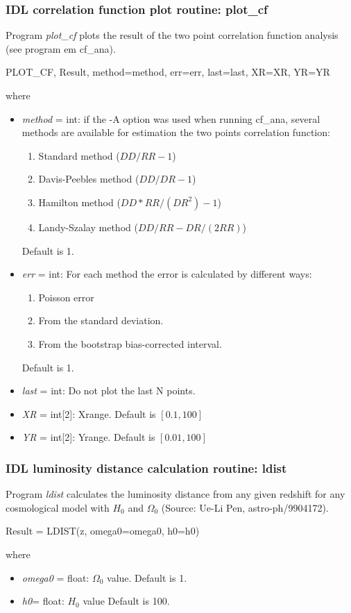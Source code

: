 \subsubsection{IDL correlation function plot routine: plot\_cf}

Program {\em plot\_cf} plots the result of the two point correlation 
function analysis (see program {em cf\_ana}).

\begin{center}
PLOT\_CF, Result, method=method, err=err, last=last, XR=XR, YR=YR
\end{center}
where
\begin{itemize}
\item {\em method }= int: if the -A option was used when running cf\_ana,
several methods are available for estimation the two points correlation function:
\begin{enumerate}
\item Standard method ($DD/RR-1$)  
\item Davis-Peebles method ($DD/DR-1$) 
\item Hamilton method ($DD*RR/(DR^2) - 1$) 
\item Landy-Szalay method ($DD/RR - DR/(2RR)$)  
\end{enumerate}
Default is 1.

\item {\em err }= int: For each method the error is calculated by different
ways:
\begin{enumerate}
\item Poisson error
\item From the standard deviation.
\item From the bootstrap bias-corrected interval.
\end{enumerate}
Default is 1.
\item {\em last }= int: Do not plot the last N points.
\item {\em XR }= int[2]: Xrange. Default is  $[0.1, 100]$
\item {\em YR }= int[2]: Yrange. Default is  $[0.01, 100]$
\end{itemize}

\subsubsection{IDL luminosity distance calculation routine: ldist}
Program {\em ldist}  calculates the luminosity distance 
from any given redshift for any 
cosmological model with $H_0$ and  $\Omega_0$
(Source: Ue-Li Pen, astro-ph/9904172).
\begin{center}
    Result = LDIST(z, omega0=omega0, h0=h0)
\end{center}
where
\begin{itemize}
\item {\em  omega0 }= float: $\Omega_0$ value. Default is 1.
\item {\em  h0}= float: $H_0$ value  Default is 100.
\end{itemize}


